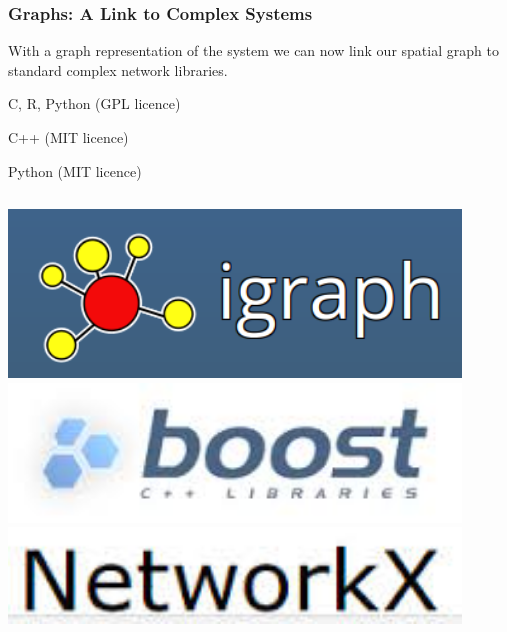 \documentclass[9pt]{beamer}
\begin{document}
\begin{frame}
  \frametitle{Graphs: A Link to Complex Systems}
  With a graph representation of the system we can now link our spatial graph to standard complex network libraries.
  \begin{description}[t]
      \item[IGraph] C, R, Python (GPL licence)
      \item[Boost: Graph and GraphParallel] C++ (MIT licence)
      \item[NetworkX] Python (MIT licence)
  \end{description}

  \vspace{1cm}
  \begin{columns}[onlytextwidth]
      \includegraphics[width=0.9\textwidth]{./Figures/software_logos/igraph_tittle.png}
      \includegraphics[width=0.9\textwidth]{./Figures/software_logos/boost_logo.jpeg}
      \includegraphics[width=0.9\textwidth]{./Figures/software_logos/networkx_logo.jpeg}
  \end{columns}

\end{frame}
\end{document}
